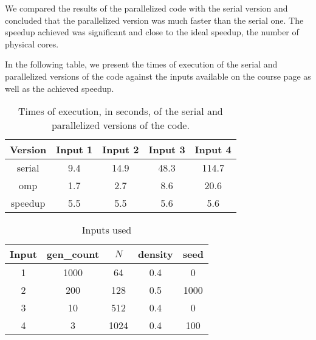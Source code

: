 \documentclass{article}
\begin{document}
We compared the results of the parallelized code with the serial version and 
concluded that the parallelized version was much faster than the serial one. 
The speedup achieved was significant and close to the ideal speedup, the number of 
physical cores.

In the following table, we present the times of execution of the serial and parallelized 
versions of the code against the inputs available on the course page as well as the achieved 
speedup.

\begin{table}[h!]
	\centering
	\begin{tabular}{||c c c c c||} 
	 \hline
	 Version & Input 1 & Input 2 & Input 3 & Input 4  \\ [0.5ex] 
	 \hline\hline
	 serial & 9.4 & 14.9 & 48.3 & 114.7 \\ 
	 omp & 1.7 & 2.7 & 8.6 & 20.6 \\ 
	 speedup & 5.5 & 5.5 & 5.6 & 5.6 \\ [1ex] 
	 \hline
	\end{tabular}
	\caption{Times of execution, in seconds, of the serial and parallelized versions of the code.}
	\label{table:1}
\end{table}

\begin{table}[h!]
	\centering
	\begin{tabular}{||c c c c c||} 
	 \hline
	 Input & gen\_count & $N$ & density & seed  \\ [0.5ex] 
	 \hline\hline
	 1 & 1000 & 64 & 0.4 & 0 \\ 
	 2 & 200 & 128 & 0.5 & 1000 \\
	 3 & 10 & 512 & 0.4 & 0 \\ 
	 4 & 3 & 1024 & 0.4 & 100 \\ [1ex] 
	 \hline
	\end{tabular}
	\caption{Inputs used}
	\label{table:2}
\end{table}

\newpage



% 

\end{document}
